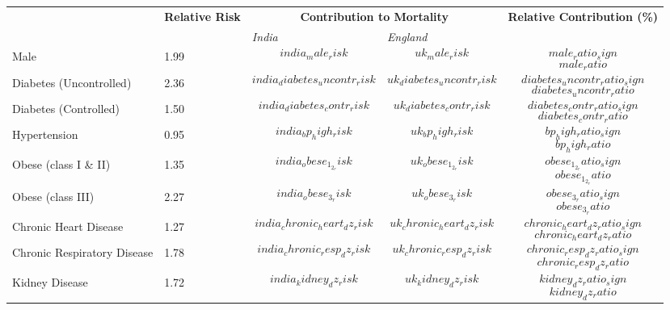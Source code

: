\usepackage[a4paper,margin=1in,landscape]{geometry}
\usepackage{array}

\begin{tabular}{p{6cm}p{1.5cm}p{2cm}p{2cm}|p{4cm}}
& \textbf{Relative \newline Risk} & \multicolumn{2}{c}{\textbf{Contribution to Mortality}} & \textbf{Relative \newline Contribution (\%)} \\[-1.5ex]
& & \emph{India} & \emph{England} &  \\[2ex]
Male & 1.99 & $$india_male_risk$$ & $$uk_male_risk$$ & \hspace{4ex}$$male_ratio_sign$$$$male_ratio$$ \\[0.25ex]
Diabetes (Uncontrolled) & 2.36 & $$india_diabetes_uncontr_risk$$ & $$uk_diabetes_uncontr_risk$$ & \hspace{4ex}$$diabetes_uncontr_ratio_sign$$$$diabetes_uncontr_ratio$$ \\[0.25ex]
Diabetes (Controlled) & 1.50 & $$india_diabetes_contr_risk$$ & $$uk_diabetes_contr_risk$$ & \hspace{4ex}$$diabetes_contr_ratio_sign$$$$diabetes_contr_ratio$$ \\[0.25ex]
Hypertension & 0.95 & $$india_bp_high_risk$$ & $$uk_bp_high_risk$$ & \hspace{4ex}$$bp_high_ratio_sign$$$$bp_high_ratio$$ \\[0.25ex]
Obese (class I \& II) & 1.35 & $$india_obese_1_2_risk$$ & $$uk_obese_1_2_risk$$ & \hspace{4ex}$$obese_1_2_ratio_sign$$$$obese_1_2_ratio$$ \\[0.25ex]
Obese (class III) & 2.27 & $$india_obese_3_risk$$ & $$uk_obese_3_risk$$ & \hspace{4ex}$$obese_3_ratio_sign$$$$obese_3_ratio$$\\[0.25ex]
Chronic Heart Disease & 1.27 & $$india_chronic_heart_dz_risk$$ & $$uk_chronic_heart_dz_risk$$ & \hspace{4ex}$$chronic_heart_dz_ratio_sign$$$$chronic_heart_dz_ratio$$ \\[0.25ex]
Chronic Respiratory Disease & 1.78 & $$india_chronic_resp_dz_risk$$ & $$uk_chronic_resp_dz_risk$$ & \hspace{4ex}$$chronic_resp_dz_ratio_sign$$$$chronic_resp_dz_ratio$$\\[0.25ex]
Kidney Disease & 1.72 & $$india_kidney_dz_risk$$ & $$uk_kidney_dz_risk$$ & \hspace{4ex}$$kidney_dz_ratio_sign$$$$kidney_dz_ratio$$ \\[0.25ex]

\end{tabular}
